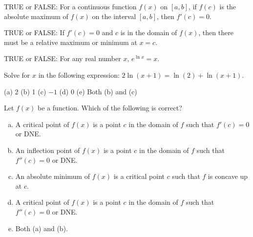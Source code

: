 \documentclass[12pt]{article}
\newenvironment{problem}[2][Problem]{\begin{trivlist}
\item[\hskip \labelsep {\bfseries #1}\hskip \labelsep {\bfseries #2.}]}{\end{trivlist}}
\begin{document}
\vspace{.7in}

\begin{problem}{20}
TRUE or FALSE: For a continuous function $f(x)$ on $[a,b]$, if $f(c)$ is the absolute maximum of $f(x)$ on the interval $[a,b]$, then $f'(c) = 0$. 
\end{problem}

\vspace{.7in}

\begin{problem}{21}
TRUE or FALSE: If $f'(c) = 0$ and $c$ is in the domain of $f(x)$, then there must be a relative maximum or minimum at $x = c$. 
\end{problem}

\vspace{.7in}

\begin{problem}{22}
TRUE or FALSE: For any real number $x$, $e^{\ln x} = x$. 
\end{problem}

\vspace{.7in}

\begin{problem}{23}
Solve for $x$ in the following expression: $2\ln(x + 1) = \ln(2) + \ln(x + 1)$. 
\begin{center}
  (a) 2 \qquad
  (b) 1 \qquad
  (c) $-1$ \qquad
  (d) 0 \qquad
  (e) Both (b) and (c)
\end{center}
\end{problem}

\newpage

\begin{problem}{24}
Let $f(x)$ be a function. Which of the following is correct? 
\begin{enumerate}[(a)]
  \item A critical point of $f(x)$ is a point $c$ in the domain of $f$ such that $f'(c) = 0$ or DNE. 
  \item An inflection point of $f(x)$ is a point $c$ in the domain of $f$ such that $f''(c) = 0$ or DNE. 
  \item An absolute minimum of $f(x)$ is a critical point $c$ such that $f$ is concave up at $c$. 
  \item A critical point of $f(x)$ is a point $c$ in the domain of $f$ such that $f''(c) = 0$ or DNE. 
  \item Both (a) and (b). 
\end{enumerate}
\end{problem}
\end{document}
